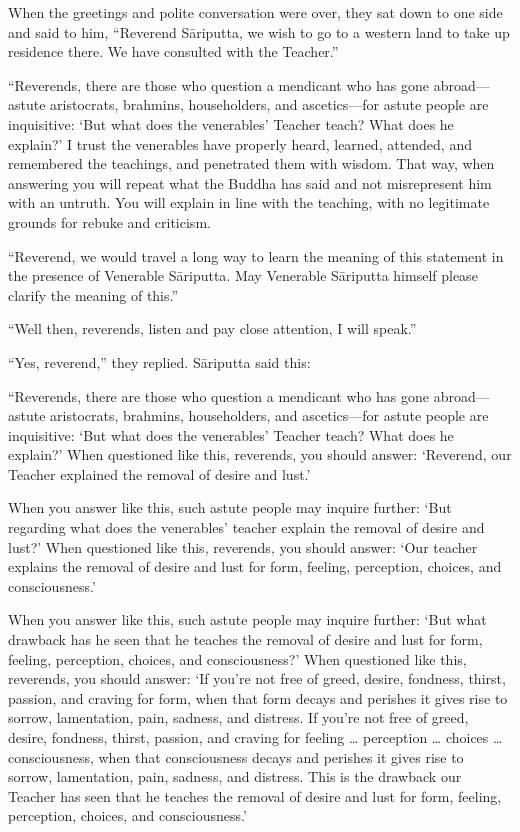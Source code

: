 \documentclass[12pt,openany]{book}%
\begin{document}
When the greetings and polite conversation were over, they sat down to one side and said to him, “Reverend \textsanskrit{Sāriputta}, we wish to go to a western land to take up residence there. We have consulted with the Teacher.” 

“Reverends, there are those who question a mendicant who has gone abroad—astute aristocrats, brahmins, householders, and ascetics—for astute people are inquisitive: ‘But what does the venerables’ Teacher teach? What does he explain?’ I trust the venerables have properly heard, learned, attended, and remembered the teachings, and penetrated them with wisdom. That way, when answering you will repeat what the Buddha has said and not misrepresent him with an untruth. You will explain in line with the teaching, with no legitimate grounds for rebuke and criticism. 

“Reverend, we would travel a long way to learn the meaning of this statement in the presence of Venerable \textsanskrit{Sāriputta}. May Venerable \textsanskrit{Sāriputta} himself please clarify the meaning of this.” 

“Well then, reverends, listen and pay close attention, I will speak.” 

“Yes, reverend,” they replied. \textsanskrit{Sāriputta} said this: 

“Reverends, there are those who question a mendicant who has gone abroad—astute aristocrats, brahmins, householders, and ascetics—for astute people are inquisitive: ‘But what does the venerables’ Teacher teach? What does he explain?’ When questioned like this, reverends, you should answer: ‘Reverend, our Teacher explained the removal of desire and lust.’ 

When you answer like this, such astute people may inquire further: ‘But regarding what does the venerables’ teacher explain the removal of desire and lust?’ When questioned like this, reverends, you should answer: ‘Our teacher explains the removal of desire and lust for form, feeling, perception, choices, and consciousness.’ 

When you answer like this, such astute people may inquire further: ‘But what drawback has he seen that he teaches the removal of desire and lust for form, feeling, perception, choices, and consciousness?’ When questioned like this, reverends, you should answer: ‘If you’re not free of greed, desire, fondness, thirst, passion, and craving for form, when that form decays and perishes it gives rise to sorrow, lamentation, pain, sadness, and distress. If you’re not free of greed, desire, fondness, thirst, passion, and craving for feeling … perception … choices … consciousness, when that consciousness decays and perishes it gives rise to sorrow, lamentation, pain, sadness, and distress. This is the drawback our Teacher has seen that he teaches the removal of desire and lust for form, feeling, perception, choices, and consciousness.’ 
\end{document}
